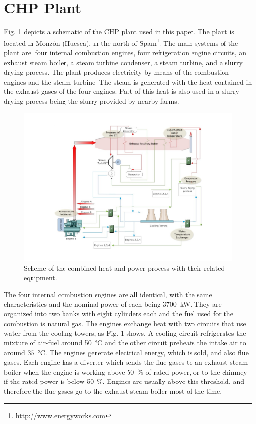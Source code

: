 \section{CHP Plant}
\label{plant}

Fig. \ref{figplant} depicts a schematic of the CHP plant used in this paper. The plant is located in Monz\'on (Huesca), in the north of Spain\footnote{\url{http://www.energyworks.com}}. The main systems of the plant are: four internal combustion engines, four refrigeration engine circuits, an exhaust steam boiler, a steam turbine condenser, a steam turbine, and a slurry drying process. The plant produces electricity by means of the combustion engines and the steam turbine. The steam is generated with the heat contained in the exhaust gases of the four engines. Part of this heat is also used in a slurry drying process being the slurry provided by nearby farms.

\begin{figure}
\includegraphics[width=1\textwidth]{plant.pdf}
\caption{Scheme of the combined heat and power process with their related equipment.}
\label{figplant}
\end{figure}

The four internal combustion engines are all identical, with the same characteristics and the nominal power of each being \SI{3700}{kW}. They are organized into two banks with eight cylinders each and the fuel used for the combustion is natural gas. The engines exchange heat with two circuits that use water from the cooling towers, as Fig. 1 shows. A cooling circuit refrigerates the mixture of air-fuel around \SI{50}{\celsius} and the other circuit preheats the intake air to around \SI{35}{\celsius}. The engines generate electrical energy, which is sold,  and also flue gases. Each engine has a diverter which sends the flue gases to an exhaust steam boiler when the engine is working above \SI{50}{\percent} of rated power, or to the chimney if the rated power is below \SI{50}{\percent}. Engines are usually above this threshold, and therefore the flue gases go to the exhaust steam boiler most of the time. 

